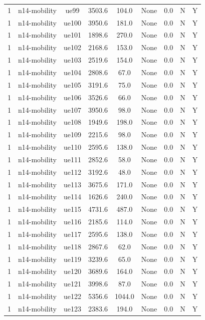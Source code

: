 \begin{table}[ht]
\begin{tabular}{|c|c|c|c|c|c|c|c|c|}
1 & n14-mobility & ue99 & 3503.6 & 104.0 & None & 0.0 & N & Y \\
1 & n14-mobility & ue100 & 3950.6 & 181.0 & None & 0.0 & N & Y \\
1 & n14-mobility & ue101 & 1898.6 & 270.0 & None & 0.0 & N & Y \\
1 & n14-mobility & ue102 & 2168.6 & 153.0 & None & 0.0 & N & Y \\
1 & n14-mobility & ue103 & 2519.6 & 154.0 & None & 0.0 & N & Y \\
1 & n14-mobility & ue104 & 2808.6 & 67.0 & None & 0.0 & N & Y \\
1 & n14-mobility & ue105 & 3191.6 & 75.0 & None & 0.0 & N & Y \\
1 & n14-mobility & ue106 & 3526.6 & 66.0 & None & 0.0 & N & Y \\
1 & n14-mobility & ue107 & 3950.6 & 98.0 & None & 0.0 & N & Y \\
1 & n14-mobility & ue108 & 1949.6 & 198.0 & None & 0.0 & N & Y \\
1 & n14-mobility & ue109 & 2215.6 & 98.0 & None & 0.0 & N & Y \\
1 & n14-mobility & ue110 & 2595.6 & 138.0 & None & 0.0 & N & Y \\
1 & n14-mobility & ue111 & 2852.6 & 58.0 & None & 0.0 & N & Y \\
1 & n14-mobility & ue112 & 3192.6 & 48.0 & None & 0.0 & N & Y \\
1 & n14-mobility & ue113 & 3675.6 & 171.0 & None & 0.0 & N & Y \\
1 & n14-mobility & ue114 & 1626.6 & 240.0 & None & 0.0 & N & Y \\
1 & n14-mobility & ue115 & 4731.6 & 487.0 & None & 0.0 & N & Y \\
1 & n14-mobility & ue116 & 2185.6 & 114.0 & None & 0.0 & N & Y \\
1 & n14-mobility & ue117 & 2595.6 & 138.0 & None & 0.0 & N & Y \\
1 & n14-mobility & ue118 & 2867.6 & 62.0 & None & 0.0 & N & Y \\
1 & n14-mobility & ue119 & 3239.6 & 65.0 & None & 0.0 & N & Y \\
1 & n14-mobility & ue120 & 3689.6 & 164.0 & None & 0.0 & N & Y \\
1 & n14-mobility & ue121 & 3998.6 & 87.0 & None & 0.0 & N & Y \\
1 & n14-mobility & ue122 & 5356.6 & 1044.0 & None & 0.0 & N & Y \\
1 & n14-mobility & ue123 & 2383.6 & 194.0 & None & 0.0 & N & Y \\

\end{tabular}
\end{table}
